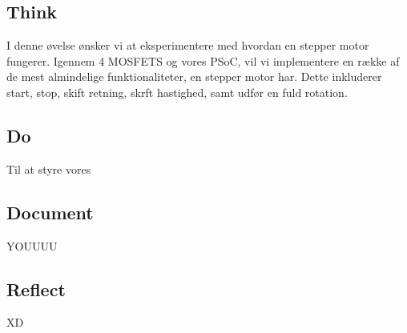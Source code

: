 \documentclass[../main.tex]{subfiles}
\begin{document}
\subsection{Think}
I denne øvelse ønsker vi at eksperimentere med hvordan en stepper motor fungerer. Igennem 4 MOSFETS og vores PSoC, vil vi implementere en række af de mest almindelige funktionaliteter, en stepper motor har. Dette inkluderer start, stop, skift retning, skrft hastighed, samt udfør en fuld rotation.

\subsection{Do}
Til at styre vores 




\subsection{Document}
YOUUUU

\subsection{Reflect}    
XD
\end{document}
